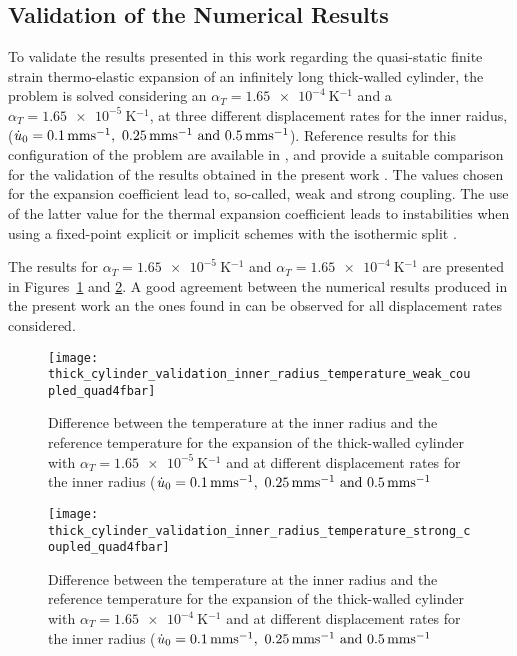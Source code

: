 \subsection{Validation of the Numerical Results}

To validate the results presented in this work regarding the quasi-static finite strain thermo-elastic expansion of an infinitely long thick-walled cylinder,
the problem is solved considering an \(\alpha_T = \SI{1.65e-4}{\kelvin^{-1}}\) and a \(\alpha_T = \SI{1.65e-5}{\kelvin^{-1}}\), at three different displacement rates for the inner raidus, (\(\dot u_0 = \SIlist{0.1; 0.25; 0.5}{\milli\meter\second^{-1}}\)).
Reference results for this configuration of the problem are available in \cite{ibrahimbegovic_thermodynamics_2009}, and provide a suitable comparison for the validation of the results obtained in the present work .
The values chosen for the expansion coefficient lead to, so-called, weak and strong coupling.
The use of the latter value for the thermal expansion coefficient leads to instabilities when using a fixed-point explicit or implicit schemes with the isothermic split \citep{ibrahimbegovic_thermodynamics_2009, erbts_accelerated_2012}.

The results for \(\alpha_T = \SI{1.65e-5}{\kelvin^{-1}}\) and \(\alpha_T =\SI{1.65e-4}{\kelvin^{-1}}\) are presented in Figures~\ref{fig:thick_cylinder_validation_inner_radius_temperature_weak_coupled_quad4fbar} and \ref{fig:thick_cylinder_validation_inner_radius_temperature_strong_coupled_quad4fbar}.
A good agreement between the numerical results produced in the present work an the ones found in \cite{ibrahimbegovic_thermodynamics_2009} can be observed for all displacement rates considered.

\begin{figure}[htbp]
  \texttt{[image: thick\_cylinder\_validation\_inner\_radius\_temperature\_weak\_coupled\_quad4fbar]}
  \caption{Difference between the temperature at the inner radius and the reference temperature for the expansion of the thick-walled cylinder with \(\alpha_T=\SI{1.65e-5}{\kelvin^{-1}}\) and at different displacement rates for the inner radius (\(\dot u_0 = \SIlist{0.1; 0.25; 0.5}{\milli\meter\second^{-1}}\)}
\label{fig:thick_cylinder_validation_inner_radius_temperature_weak_coupled_quad4fbar}

\end{figure}
\begin{figure}[htbp]
  \texttt{[image: thick\_cylinder\_validation\_inner\_radius\_temperature\_strong\_coupled\_quad4fbar]}
  \caption{Difference between the temperature at the inner radius and the reference temperature for the expansion of the thick-walled cylinder with \(\alpha_T=\SI{1.65e-4}{\kelvin^{-1}}\) and at different displacement rates for the inner radius (\(\dot u_0 = \SIlist{0.1; 0.25; 0.5}{\milli\meter\second^{-1}}\)}
\label{fig:thick_cylinder_validation_inner_radius_temperature_strong_coupled_quad4fbar}
\end{figure}

